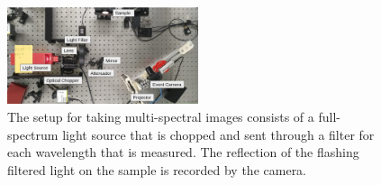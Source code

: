 \begin{figure}[t!]
    \centering
    \includegraphics[width=0.5\textwidth]{chapters/papers/ED/resources/images/multi-spectral/experiment_setup.png}
    \caption[Multi-Spectral Material Differentiation Setup]{The setup for taking multi-spectral images consists of a full-spectrum light source that is chopped and sent through a filter for each wavelength that is measured. The reflection of the flashing filtered light on the sample is recorded by the camera.}
    \label{fig:spectral_setup}
\end{figure}